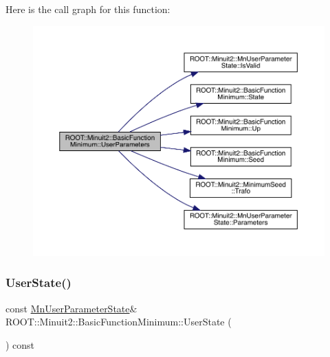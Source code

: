 Here is the call graph for this function\+:
\nopagebreak
\begin{figure}[H]
\begin{center}
\leavevmode
\includegraphics[width=350pt]{de/d25/classROOT_1_1Minuit2_1_1BasicFunctionMinimum_aa6fa4f1678939015849b6a2ab6023238_cgraph}
\end{center}
\end{figure}
\mbox{\label{classROOT_1_1Minuit2_1_1BasicFunctionMinimum_ac1757a094afe32c23b548fafaff5acc1}} 
\subsubsection{\texorpdfstring{UserState()}{UserState()}\hspace{0.1cm}{\footnotesize\ttfamily [1/3]}}
{\footnotesize\ttfamily const \mbox{\hyperlink{classROOT_1_1Minuit2_1_1MnUserParameterState}{Mn\+User\+Parameter\+State}}\& R\+O\+O\+T\+::\+Minuit2\+::\+Basic\+Function\+Minimum\+::\+User\+State (\begin{DoxyParamCaption}{ }\end{DoxyParamCaption}) const\hspace{0.3cm}{\ttfamily [inline]}}

